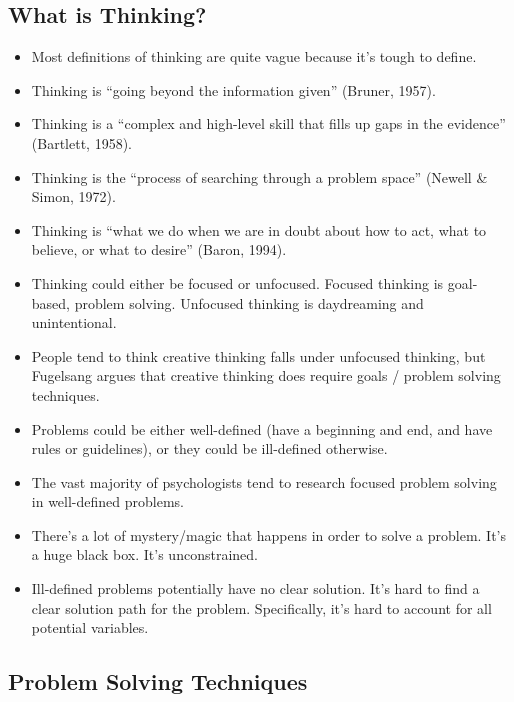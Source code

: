 \documentclass[]{article}
\begin{document}
		\subsection{What is Thinking?}
			\begin{itemize}
				\item Most definitions of thinking are quite vague because it's tough to define.
				\item Thinking is ``going beyond the information given'' (Bruner, 1957).
				\item Thinking is a ``complex and high-level skill that fills up gaps in the evidence'' (Bartlett, 1958).
				\item Thinking is the ``process of searching through a problem space'' (Newell \& Simon, 1972).
				\item Thinking is ``what we do when we are in doubt about how to act, what to believe, or what to desire'' (Baron, 1994).
				\item Thinking could either be focused or unfocused. Focused thinking is goal-based, problem solving. Unfocused thinking is daydreaming and unintentional.
				\item People tend to think creative thinking falls under unfocused thinking, but Fugelsang argues that creative thinking does require goals / problem solving techniques.
				\item Problems could be either well-defined (have a beginning and end, and have rules or guidelines), or they could be ill-defined otherwise.
				\item The vast majority of psychologists tend to research focused problem solving in well-defined problems.
				\item There's a lot of mystery/magic that happens in order to solve a problem. It's a huge black box. It's unconstrained.
				\item Ill-defined problems potentially have no clear solution. It's hard to find a clear solution path for the problem. Specifically, it's hard to account for all potential variables.
			\end{itemize}

		\subsection{Problem Solving Techniques}
\end{document}
